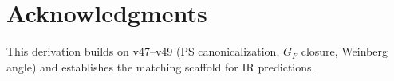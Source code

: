 \documentclass[11pt,a4paper]{article}
\begin{document}
\section*{Acknowledgments}

This derivation builds on v47--v49 (PS canonicalization, $G_F$ closure, Weinberg angle)
and establishes the matching scaffold for IR predictions.
\end{document}
